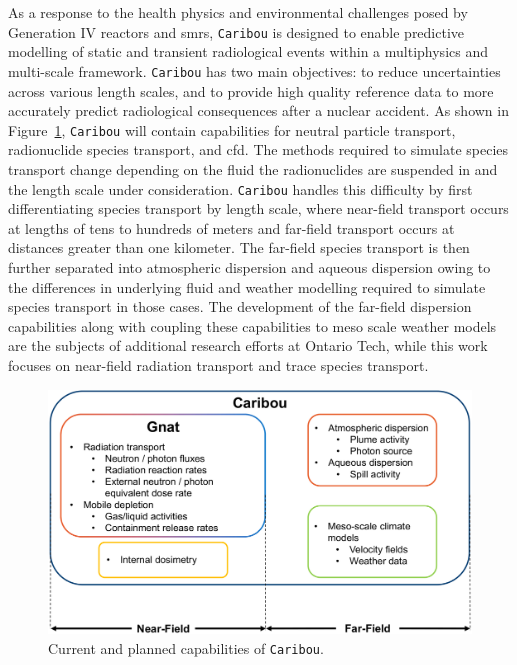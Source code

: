 As a response to the health physics and environmental challenges posed by Generation IV reactors and \acrshort{smrs}, \texttt{Caribou} is designed to enable predictive modelling of static and transient radiological events within a multiphysics and multi-scale framework. \texttt{Caribou} has two main objectives: to reduce uncertainties across various length scales, and to provide high quality reference data to more accurately predict radiological consequences after a nuclear accident. As shown in Figure~\ref{fig:introduction:ms:caribou:caribou}, \texttt{Caribou} will contain capabilities for neutral particle transport, radionuclide species transport, and \acrshort{cfd}. The methods required to simulate species transport change depending on the fluid the radionuclides are suspended in and the length scale under consideration. \texttt{Caribou} handles this difficulty by first differentiating species transport by length scale, where near-field transport occurs at lengths of tens to hundreds of meters and far-field transport occurs at distances greater than one kilometer. The far-field species transport is then further separated into atmospheric dispersion and aqueous dispersion owing to the differences in underlying fluid and weather modelling required to simulate species transport in those cases. The development of the far-field dispersion capabilities along with coupling these capabilities to meso scale weather models are the subjects of additional research efforts at Ontario Tech, while this work focuses on near-field radiation transport and trace species transport.

\begin{figure}[H]
    \centering
    \includegraphics[width=1.0\textwidth]{images/introduction/caribou.png}
    \caption{Current and planned capabilities of \texttt{Caribou}.}
    \label{fig:introduction:ms:caribou:caribou}
\end{figure}

